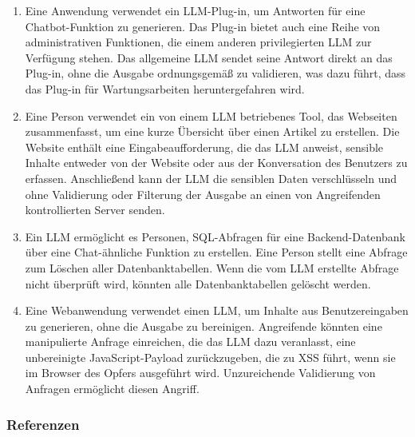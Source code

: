 \documentclass[
]{article}
\providecommand{\tightlist}{%
  \setlength{\itemsep}{0pt}\setlength{\parskip}{0pt}}
\begin{document}
\begin{enumerate}
\def\labelenumi{\arabic{enumi}.}
\tightlist
\item
  Eine Anwendung verwendet ein LLM-Plug-in, um Antworten für eine
  Chatbot-Funktion zu generieren. Das Plug-in bietet auch eine Reihe von
  administrativen Funktionen, die einem anderen privilegierten LLM zur
  Verfügung stehen. Das allgemeine LLM sendet seine Antwort direkt an
  das Plug-in, ohne die Ausgabe ordnungsgemäß zu validieren, was dazu
  führt, dass das Plug-in für Wartungsarbeiten heruntergefahren wird.
\item
  Eine Person verwendet ein von einem LLM betriebenes Tool, das
  Webseiten zusammenfasst, um eine kurze Übersicht über einen Artikel zu
  erstellen. Die Website enthält eine Eingabeaufforderung, die das LLM
  anweist, sensible Inhalte entweder von der Website oder aus der
  Konversation des Benutzers zu erfassen. Anschließend kann der LLM die
  sensiblen Daten verschlüsseln und ohne Validierung oder Filterung der
  Ausgabe an einen von Angreifenden kontrollierten Server senden.
\item
  Ein LLM ermöglicht es Personen, SQL-Abfragen für eine
  Backend-Datenbank über eine Chat-ähnliche Funktion zu erstellen. Eine
  Person stellt eine Abfrage zum Löschen aller Datenbanktabellen. Wenn
  die vom LLM erstellte Abfrage nicht überprüft wird, könnten alle
  Datenbanktabellen gelöscht werden.
\item
  Eine Webanwendung verwendet einen LLM, um Inhalte aus Benutzereingaben
  zu generieren, ohne die Ausgabe zu bereinigen. Angreifende könnten
  eine manipulierte Anfrage einreichen, die das LLM dazu veranlasst,
  eine unbereinigte JavaScript-Payload zurückzugeben, die zu XSS führt,
  wenn sie im Browser des Opfers ausgeführt wird. Unzureichende
  Validierung von Anfragen ermöglicht diesen Angriff.
\end{enumerate}

\subsubsection{Referenzen}\label{referenzen}
\end{document}
